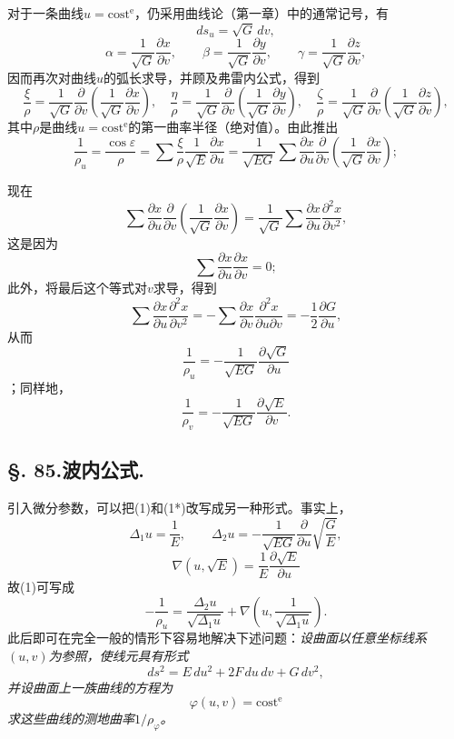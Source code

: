 对于一条曲线\(u=\mathrm{cost}^{\mathrm e}\)，仍采用曲线论（第一章）中的通常记号，有
\[
 ds_u=\sqrt G\,dv,
\]
\[
 \alpha=\frac1{\sqrt G}\frac{\partial x}{\partial v},
  \qquad
 \beta=\frac1{\sqrt G}\frac{\partial y}{\partial v},
  \qquad
 \gamma=\frac1{\sqrt G}\frac{\partial z}{\partial v},
\]
因而再次对曲线\(u\)的弧长求导，并顾及弗雷内公式，得到
\[
 \frac{\xi}{\rho}=\frac1{\sqrt G}\frac{\partial}{\partial v}\left(\frac1{\sqrt G}\frac{\partial x}{\partial v}\right),\quad
 \frac{\eta}{\rho}=\frac1{\sqrt G}\frac{\partial}{\partial v}\left(\frac1{\sqrt G}\frac{\partial y}{\partial v}\right),\quad
 \frac{\zeta}{\rho}=\frac1{\sqrt G}\frac{\partial}{\partial v}\left(\frac1{\sqrt G}\frac{\partial z}{\partial v}\right),
\]
其中\(\rho\)是曲线\(u=\mathrm{cost}^{\mathrm e}\)的第一曲率半径（绝对值）。由此推出
\[
 \frac1{\rho_u}=\frac{\cos\varepsilon}{\rho}=\sum\frac{\xi}{\rho}\frac1{\sqrt E}\frac{\partial x}{\partial u}=\frac1{\sqrt{EG}}\sum\frac{\partial x}{\partial u}\frac{\partial}{\partial v}\left(\frac1{\sqrt G}\frac{\partial x}{\partial v}\right);
\]

现在
\[
 \sum\frac{\partial x}{\partial u}\frac{\partial}{\partial v}\left(\frac1{\sqrt G}\frac{\partial x}{\partial v}\right)
 =\frac1{\sqrt G}\sum\frac{\partial x}{\partial u}\frac{\partial^2x}{\partial v^2},
\]
这是因为
\[
 \sum\frac{\partial x}{\partial u}\frac{\partial x}{\partial v}=0;
\]
此外，将最后这个等式对\(v\)求导，得到
\[
 \sum\frac{\partial x}{\partial u}\frac{\partial^2x}{\partial v^2}
  =-\sum\frac{\partial x}{\partial v}\frac{\partial^2x}{\partial u\partial v}
  =-\frac12\frac{\partial G}{\partial u},
\]
从而
\begin{equation}\tag{1}
 \frac1{\rho_u}=-\frac1{\sqrt{EG}}\frac{\partial\sqrt G}{\partial u}
\end{equation}
；同样地，
\begin{equation}\tag{1*}
 \frac1{\rho_v}=-\frac1{\sqrt{EG}}\frac{\partial\sqrt E}{\partial v}.
\end{equation}

\subsection*{\S. 85.\quad 波内公式.}

引入微分参数，可以把(1)和(1*)改写成另一种形式。事实上，
\[
 \Delta_1u=\frac1{E},\qquad
 \Delta_2u=-\frac1{\sqrt{EG}}\frac{\partial}{\partial u}\sqrt{\frac GE},
\]
\[
 \nabla(u,\sqrt E)=\frac1E\frac{\partial\sqrt E}{\partial u}
\]
故(1)可写成
\begin{equation}\tag{2}
 -\frac1{\rho_u}=\frac{\Delta_2u}{\sqrt{\Delta_1u}}+\nabla\left(u,\frac1{\sqrt{\Delta_1u}}\right).
\end{equation}
此后即可在完全一般的情形下容易地解决下述问题：\emph{设曲面以任意坐标线系\((u,v)\)为参照，使线元具有形式}
\[
 ds^2=E\,du^2+2F\,du\,dv+G\,dv^2,
\]
\emph{并设曲面上一族曲线的方程为}
\[
 \varphi(u,v)=\mathrm{cost}^{\mathrm e}
\]
\emph{求这些曲线的测地曲率\(1/\rho_\varphi\)。}

